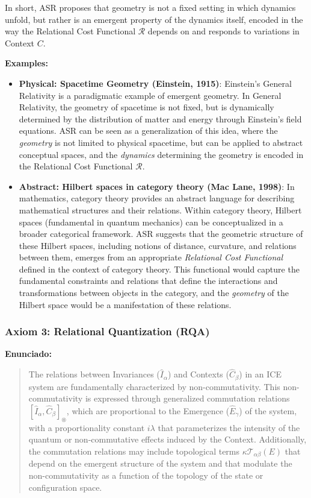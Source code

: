\documentclass{article}
\begin{document}
In short, ASR proposes that geometry is not a fixed setting in which dynamics unfold, but rather is an emergent property of the dynamics itself, encoded in the way the Relational Cost Functional $\mathcal{R}$ depends on and responds to variations in Context $C$.

\textbf{Examples:}
\begin{itemize}
\item \textbf{Physical: Spacetime Geometry (Einstein, 1915)}: Einstein's General Relativity is a paradigmatic example of emergent geometry. In General Relativity, the geometry of spacetime is not fixed, but is dynamically determined by the distribution of matter and energy through Einstein's field equations. ASR can be seen as a generalization of this idea, where the \textit{geometry} is not limited to physical spacetime, but can be applied to abstract conceptual spaces, and the \textit{dynamics} determining the geometry is encoded in the Relational Cost Functional $\mathcal{R}$.

   \item \textbf{Abstract: Hilbert spaces in category theory (Mac Lane, 1998)}: In mathematics, category theory provides an abstract language for describing mathematical structures and their relations. Within category theory, Hilbert spaces (fundamental in quantum mechanics) can be conceptualized in a broader categorical framework. ASR suggests that the geometric structure of these Hilbert spaces, including notions of distance, curvature, and relations between them, emerges from an appropriate \textit{Relational Cost Functional} defined in the context of category theory. This functional would capture the fundamental constraints and relations that define the interactions and transformations between objects in the category, and the \textit{geometry} of the Hilbert space would be a manifestation of these relations.
\end{itemize}

\subsubsection{Axiom 3: Relational Quantization (RQA)}
\textbf{Enunciado:}
\begin{quote}
    The relations between Invariances ($\hat{I}_\alpha$) and Contexts ($\hat{C}_\beta$) in an ICE system are fundamentally characterized by non-commutativity. This non-commutativity is expressed through generalized commutation relations $[\hat{I}_\alpha, \hat{C}_\beta]_{\circledast}$, which are proportional to the Emergence ($\hat{E}_\gamma$) of the system, with a proportionality constant $i\lambda$ that parameterizes the intensity of the quantum or non-commutative effects induced by the Context. Additionally, the commutation relations may include topological terms $\kappa \mathcal{T}_{\alpha\beta}(E)$ that depend on the emergent structure of the system and that modulate the non-commutativity as a function of the topology of the state or configuration space.
\end{quote}
\end{document}
